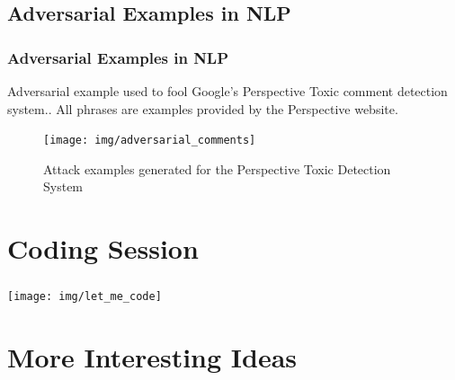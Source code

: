 \documentclass[12pt]{beamer}
\begin{document}
\subsection{Adversarial Examples in NLP}
\begin{frame}
\frametitle{Adversarial Examples in NLP}
Adversarial example used to fool Google's Perspective Toxic comment detection system.\protect\footnotemark. All phrases are examples provided by the Perspective website\protect\footnotemark.

\begin{figure}
	\centering
	\texttt{[image: img/adversarial\_comments]}
	\caption{ Attack examples generated for the Perspective Toxic Detection System}
	\label{fig:adversarialcomments}
\end{figure}

\end{frame}


\section{Coding Session}
\begin{frame}
\frametitle{}
\begin{center}
	\texttt{[image: img/let\_me\_code]}
\end{center}

\end{frame}

\section{More Interesting Ideas}
\begin{frame}
\frametitle{}

\end{frame}
\end{document}

